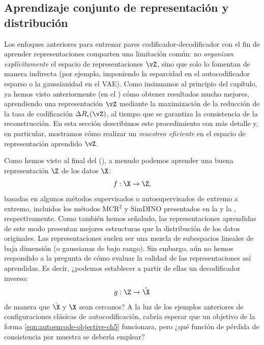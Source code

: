 \documentclass[../../book-main_es.tex]{subfiles}
\begin{document}
\subsection{Aprendizaje conjunto de representación y distribución}
\label{sec:RAE}

Los enfoques anteriores para entrenar pares codificador-decodificador con el fin de aprender representaciones
comparten una limitación común: no \textit{organizan explícitamente} el
espacio de representaciones $\vZ$, sino que solo lo fomentan de manera indirecta (por ejemplo, imponiendo
la esparcidad en el autocodificador esparso o la gaussianidad en el VAE).
Como insinuamos al principio del capítulo, ya hemos visto anteriormente (en el ) 
cómo obtener resultados mucho mejores, aprendiendo una representación $\vZ$ mediante la maximización de 
la reducción de la tasa de codificación $\Delta
R_{\epsilon}(\vZ)$, al tiempo que se garantiza la consistencia de la reconstrucción.
En esta sección describimos este
procedimiento con más detalle y, en particular, mostramos cómo
realizar un \textit{muestreo eficiente} en el espacio de representación aprendido $\vZ$.

Como hemos visto al final del  (), a menudo podemos aprender una buena
representación $\Z$ de los datos $\X$:
\begin{equation}
    f: \X \rightarrow \Z,
\end{equation}
basadas en algunos métodos supervisados o autosupervisados de extremo a extremo, incluidos los
métodos MCR$^2$ y SimDINO presentados en la 
y la , respectivamente. Como también hemos señalado, las
representaciones aprendidas de este modo
presentan mejores estructuras que la distribución de los datos originales. Las representaciones
suelen ser una mezcla de subespacios lineales de baja dimensión (o gaussianas de bajo rango).
Sin embargo, aún no hemos respondido a la pregunta de cómo evaluar la
calidad de las representaciones así aprendidas. Es decir, ¿podemos establecer a partir de ellas
un decodificador inverso:
\begin{equation}
    g: \Z \rightarrow \hat{\X}
\end{equation}
de manera que $\hat \X$ y $\X$ sean cercanos? A la luz de los ejemplos anteriores de
configuraciones clásicas de autocodificación, cabría esperar que un objetivo de la forma
\eqref{eqn:autoencode-objective-ch5} funcionara, pero ¿qué función de pérdida de consistencia
por muestra se debería emplear?
\end{document}
